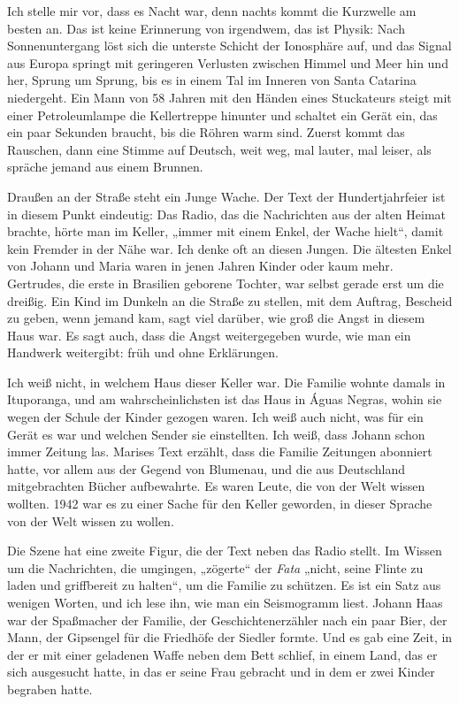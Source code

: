 \documentclass[
  ngerman,
  11pt,
  openany]{book}
\begin{document}
Ich stelle mir vor, dass es Nacht war, denn nachts kommt die Kurzwelle
am besten an. Das ist keine Erinnerung von irgendwem, das ist Physik:
Nach Sonnenuntergang löst sich die unterste Schicht der Ionosphäre auf,
und das Signal aus Europa springt mit geringeren Verlusten zwischen
Himmel und Meer hin und her, Sprung um Sprung, bis es in einem Tal im
Inneren von Santa Catarina niedergeht. Ein Mann von 58 Jahren mit den
Händen eines Stuckateurs steigt mit einer Petroleumlampe die
Kellertreppe hinunter und schaltet ein Gerät ein, das ein paar Sekunden
braucht, bis die Röhren warm sind. Zuerst kommt das Rauschen, dann eine
Stimme auf Deutsch, weit weg, mal lauter, mal leiser, als spräche jemand
aus einem Brunnen.

Draußen an der Straße steht ein Junge Wache. Der Text der
Hundertjahrfeier ist in diesem Punkt eindeutig: Das Radio, das die
Nachrichten aus der alten Heimat brachte, hörte man im Keller, „immer
mit einem Enkel, der Wache hielt``, damit kein Fremder in der Nähe war.
Ich denke oft an diesen Jungen. Die ältesten Enkel von Johann und Maria
waren in jenen Jahren Kinder oder kaum mehr. Gertrudes, die erste in
Brasilien geborene Tochter, war selbst gerade erst um die dreißig. Ein
Kind im Dunkeln an die Straße zu stellen, mit dem Auftrag, Bescheid zu
geben, wenn jemand kam, sagt viel darüber, wie groß die Angst in diesem
Haus war. Es sagt auch, dass die Angst weitergegeben wurde, wie man ein
Handwerk weitergibt: früh und ohne Erklärungen.

Ich weiß nicht, in welchem Haus dieser Keller war. Die Familie wohnte
damals in Ituporanga, und am wahrscheinlichsten ist das Haus in Águas
Negras, wohin sie wegen der Schule der Kinder gezogen waren. Ich weiß
auch nicht, was für ein Gerät es war und welchen Sender sie einstellten.
Ich weiß, dass Johann schon immer Zeitung las. Marises Text erzählt,
dass die Familie Zeitungen abonniert hatte, vor allem aus der Gegend von
Blumenau, und die aus Deutschland mitgebrachten Bücher aufbewahrte. Es
waren Leute, die von der Welt wissen wollten. 1942 war es zu einer Sache
für den Keller geworden, in dieser Sprache von der Welt wissen zu
wollen.

Die Szene hat eine zweite Figur, die der Text neben das Radio stellt. Im
Wissen um die Nachrichten, die umgingen, „zögerte`` der \emph{Fata}
„nicht, seine Flinte zu laden und griffbereit zu halten``, um die
Familie zu schützen. Es ist ein Satz aus wenigen Worten, und ich lese
ihn, wie man ein Seismogramm liest. Johann Haas war der Spaßmacher der
Familie, der Geschichtenerzähler nach ein paar Bier, der Mann, der
Gipsengel für die Friedhöfe der Siedler formte. Und es gab eine Zeit, in
der er mit einer geladenen Waffe neben dem Bett schlief, in einem Land,
das er sich ausgesucht hatte, in das er seine Frau gebracht und in dem
er zwei Kinder begraben hatte.
\end{document}
